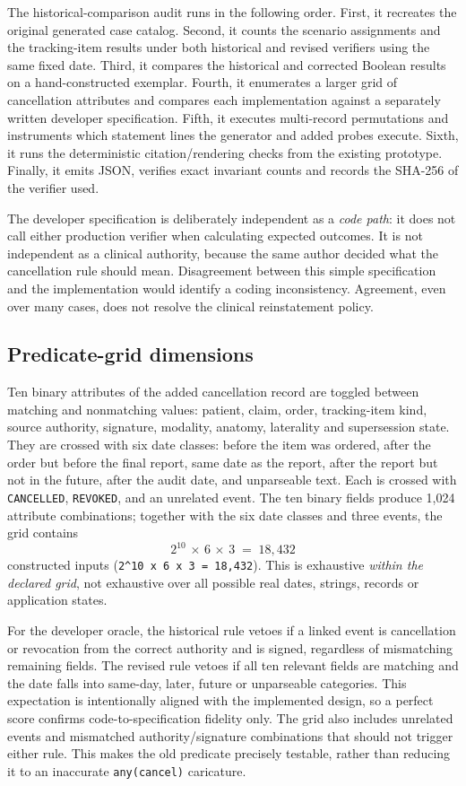 \documentclass[11pt,twocolumn]{article}
\newcommand{\code}[1]{\texttt{#1}}
\begin{document}
The historical-comparison audit runs in the following order. First, it recreates the original generated case catalog. Second, it counts the scenario assignments and the tracking-item results under both historical and revised verifiers using the same fixed date. Third, it compares the historical and corrected Boolean results on a hand-constructed exemplar. Fourth, it enumerates a larger grid of cancellation attributes and compares each implementation against a separately written developer specification. Fifth, it executes multi-record permutations and instruments which statement lines the generator and added probes execute. Sixth, it runs the deterministic citation/rendering checks from the existing prototype. Finally, it emits JSON, verifies exact invariant counts and records the SHA-256 of the verifier used.

The developer specification is deliberately independent as a \emph{code path}: it does not call either production verifier when calculating expected outcomes. It is not independent as a clinical authority, because the same author decided what the cancellation rule should mean. Disagreement between this simple specification and the implementation would identify a coding inconsistency. Agreement, even over many cases, does not resolve the clinical reinstatement policy.

\subsection{Predicate-grid dimensions}
Ten binary attributes of the added cancellation record are toggled between matching and nonmatching values: patient, claim, order, tracking-item kind, source authority, signature, modality, anatomy, laterality and supersession state. They are crossed with six date classes: before the item was ordered, after the order but before the final report, same date as the report, after the report but not in the future, after the audit date, and unparseable text. Each is crossed with \code{CANCELLED}, \code{REVOKED}, and an unrelated event. The ten binary fields produce 1,024 attribute combinations; together with the six date classes and three events, the grid contains
\[
2^{10}\,\times\,6\,\times\,3\;=\;18{,}432
\]
constructed inputs (\mbox{\texttt{2\textasciicircum{}10 x 6 x 3 = 18,432}}). This is exhaustive \emph{within the declared grid}, not exhaustive over all possible real dates, strings, records or application states.

For the developer oracle, the historical rule vetoes if a linked event is cancellation or revocation from the correct authority and is signed, regardless of mismatching remaining fields. The revised rule vetoes if all ten relevant fields are matching and the date falls into same-day, later, future or unparseable categories. This expectation is intentionally aligned with the implemented design, so a perfect score confirms code-to-specification fidelity only. The grid also includes unrelated events and mismatched authority/signature combinations that should not trigger either rule. This makes the old predicate precisely testable, rather than reducing it to an inaccurate \code{any(cancel)} caricature.
\end{document}
